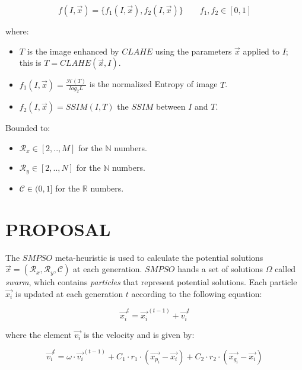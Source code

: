 \documentclass[spanish,twocolumn]{article}
\begin{document}
\begin{equation}\label{eq:fitness}
    f(I, \overrightarrow{x}) = \{ f_1(I, \overrightarrow{x}), f_2(I, \overrightarrow{x}) \} \qquad f_1,f_2 \in [0,1]
\end{equation}

where:
\begin{itemize}
\item $T$ is the image enhanced by $CLAHE$ using the parameters $\overrightarrow{x}$ applied to $I$; this is $T=CLAHE(\overrightarrow{x},I)$.
\item $f_{1}(I, \overrightarrow{x})=\frac{\mathscr{H}(T)}{log_{2}L}$ is the normalized Entropy of image $T$.
\item $f_{2}(I, \overrightarrow{x})=SSIM(I,T)$ the $SSIM$ between $I$ and $T$.



\end{itemize}

Bounded to:

\begin{itemize}
\item $\mathcal{R}_x \in [2,..,M]$ for the $\mathbb{N}$ numbers.
\item $\mathcal{R}_y \in [2,..,N]$ for the $\mathbb{N}$ numbers.
\item $\mathscr{C} \in (0,1]$ for the $\mathbb{R}$ numbers.
\end{itemize}

\section{PROPOSAL}
\label{sec:propuesta}

The $SMPSO$ \cite{4938830} meta-heuristic is used to calculate the potential solutions $\overrightarrow{x}=(\mathcal{R}_x, \mathcal{R}_y, \mathcal{C})$ at each generation. $SMPSO$ hands a set of solutions $\Omega$ called {\it swarm}, which contains {\it particles} that represent potential solutions. Each particle $\overrightarrow{x_i}$ is updated at each generation $t$ according to the following equation: 

\begin{equation}\label{eq:psobasico}
\overrightarrow{x_i}^t = \overrightarrow{x_i}^{(t-1)} + \overrightarrow{v_i}^t
\end{equation}

where the element $\overrightarrow{v_i}$ is the velocity and is given by:


\begin{equation}\label{eq:psobasico2}
\overrightarrow{v_i}^t = \omega \cdot \overrightarrow{v_i}^{(t-1)} + C_1 \cdot r_1 \cdot (\overrightarrow{x_{p_i}}-\overrightarrow{x_i}) + C_2 \cdot r_2 \cdot (\overrightarrow{x_{g_i}}-\overrightarrow{x_i})
\end{equation}
\end{document}
